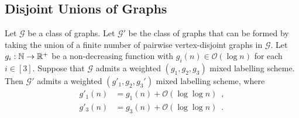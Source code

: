 \documentclass{patmorin}
\newcommand{\Oh}{\calO}
\newcommand{\calG}{\mathcal{G}}
\newcommand{\calO}{\mathcal{O}}
\begin{document}
\subsection{Disjoint Unions of Graphs}

\begin{lem}\label{disjoint_union_ii}
    Let $\calG$ be a class of graphs. Let $\calG'$ be the class of graphs that can be formed by taking the union of a finite number of pairwise vertex-disjoint graphs in $\calG$.
    Let $g_i:\mathbb{N}\to\mathbb{R}^+$ be a non-decreasing function  with $g_i(n)\in \Oh(\log n)$ for each $i\in[3]$.
    Suppose that $\calG$ admits a weighted $(g_1,g_2,g_3)$ mixed labelling scheme.
    Then $\calG'$ admits a weighted $(g'_1,g_2,g_3')$ mixed labelling scheme, where
    \begin{align*}
        g'_1(n) & = g_1(n)+\Oh(\log\log n)\enspace, \\
        g'_3(n) & = g_3(n)+\Oh(\log\log n) \enspace .
    \end{align*}
  \end{lem}
\end{document}
